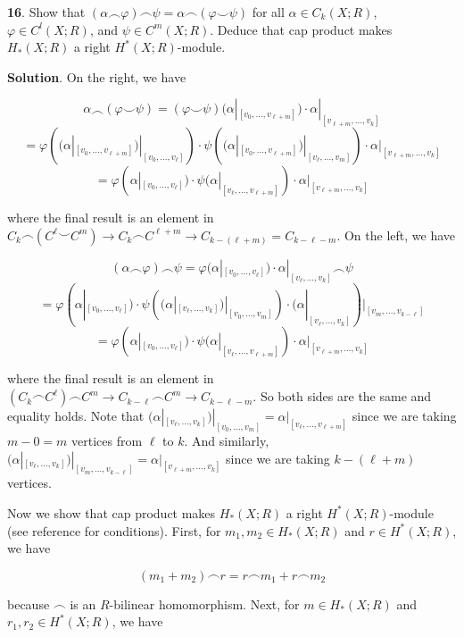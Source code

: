 \documentclass{article}
\begin{document}
\tab\textbf{16}. Show that $(\alpha\frown \varphi)\frown \psi = \alpha \frown (\varphi\smile \psi)$ for all $\alpha\in C_{k}(X;R)$, $\varphi\in C^{l}(X; R)$, and $\psi\in C^{m}(X;R)$. Deduce that cap product makes $H_{\ast}(X;R)$ a right $H^{\ast}(X;R)$-module.
\medskip

\textbf{Solution}. On the right, we have

$$\alpha\frown(\varphi\smile \psi) = (\varphi\smile \psi)(\alpha|_{[v_{0},\ldots,v_{\ell+m}]})\cdot \alpha|_{[v_{\ell+m},\ldots, v_{k}]}$$
$$=\varphi\left((\alpha|_{[v_{0},\ldots,v_{\ell+m}]})|_{[v_{0},\ldots,v_{\ell}]}\right)\cdot \psi\left((\alpha|_{[v_{0},\ldots,v_{\ell+m}]})|_{[v_{\ell},\ldots,v_{m}]}\right)\cdot \alpha|_{[v_{\ell+m},\ldots, v_{k}]}$$
$$=\varphi(\alpha|_{[v_{0},\ldots,v_{\ell}]})\cdot \psi(\alpha|_{[v_{\ell},\ldots,v_{\ell+m}]})\cdot \alpha|_{[v_{\ell+m},\ldots, v_{k}]}$$

where the final result is an element in $C_{k}\frown (C^{\ell}\smile C^{m})\to C_{k}\frown C^{\ell+m}\to C_{k-(\ell+m)} = C_{k-\ell-m}$. On the left, we have

$$(\alpha\frown\varphi)\frown \psi = \varphi(\alpha|_{[v_{0},\ldots,v_{\ell}]})\cdot \alpha|_{[v_{\ell},\ldots,v_{k}]} \frown \psi$$
$$= \varphi(\alpha|_{[v_{0},\ldots, v_{\ell}]})\cdot \psi\left((\alpha|_{[v_{\ell},\ldots,v_{k}]})|_{[v_{0},\ldots, v_{m}]}\right)\cdot (\alpha|_{[v_{\ell},\ldots,v_{k}]})|_{[v_{m},\ldots,v_{k-\ell}]}$$
$$= \varphi(\alpha|_{[v_{0},\ldots, v_{\ell}]})\cdot \psi(\alpha|_{[v_{\ell},\ldots,v_{\ell+m}]})\cdot \alpha|_{[v_{\ell+m},\ldots,v_{k}]}$$

where the final result is an element in $(C_{k}\frown C^{\ell})\frown C^{m}\to C_{k-\ell}\frown C^{m}\to C_{k-\ell-m}$. So both sides are the same and equality holds. Note that $(\alpha|_{[v_{\ell},\ldots,v_{k}]})|_{[v_{0},\ldots, v_{m}]} = \alpha|_{[v_{\ell},\ldots,v_{\ell+m}]}$ since we are taking $m - 0 = m$ vertices from $\ell$ to $k$. And similarly, $(\alpha|_{[v_{\ell},\ldots,v_{k}]})|_{[v_{m},\ldots,v_{k-\ell}]} = \alpha|_{[v_{\ell+m},\ldots,v_{k}]}$ since we are taking $k - (\ell + m)$ vertices.
\medskip

Now we show that cap product makes $H_{\ast}(X; R)$ a right $H^{\ast}(X; R)$-module (see reference for conditions). First, for $m_{1}, m_{2}\in H_{\ast}(X;R)$ and $r\in H^{\ast}(X; R)$, we have

$$(m_{1}+m_{2})\frown r = r\frown m_{1} + r\frown m_{2}$$

because $\frown$ is an $R$-bilinear homomorphism. Next, for $m\in H_{\ast}(X; R)$ and $r_{1}, r_{2}\in H^{\ast}(X;R)$, we have
\end{document}
